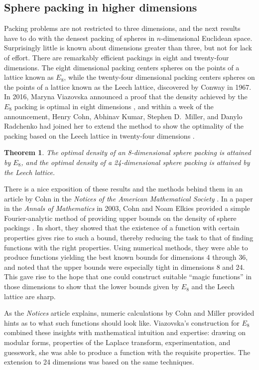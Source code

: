 \documentclass[12pt]{amsart}
\newtheorem{theorem}{Theorem}[section]
\theoremstyle{definition}
\theoremstyle{remark}
\numberwithin{equation}{section}
\begin{document}
\subsection{Sphere packing in higher dimensions}

Packing problems are not restricted to three dimensions, and the next results have to do with the densest packing of spheres in $n$-dimensional Euclidean space. Surprisingly little is known about dimensions greater than three, but not for lack of effort. There are remarkably efficient packings in eight and twenty-four dimensions. The eight dimensional packing centers spheres on the points of a lattice known as $E_8$, while the twenty-four dimensional packing centers spheres on the points of a lattice known as the Leech lattice, discovered by Conway in 1967. In 2016, Maryna Viazovska announced a proof that the density achieved by the $E_8$ packing is optimal in eight dimensions \cite{viazovska:17}, and within a week of the announcement, Henry Cohn, Abhinav Kumar, Stephen D.~Miller, and Danylo Radchenko had joined her to extend the method to show the optimality of the packing based on the Leech lattice in twenty-four dimensions \cite{cohn:et:al:17}.

\begin{theorem}
\label{theorem:leech}
The optimal density of an 8-dimensional sphere packing is attained by $E_8$, and the optimal density of a 24-dimensional sphere packing is attained by the Leech lattice.
\end{theorem}

There is a nice exposition of these results and the methods behind them in an article by Cohn in the \emph{Notices of the American Mathematical Society} \cite{cohn:17}. In a paper in the \emph{Annals of Mathematics} in 2003, Cohn and Noam Elkies provided a simple Fourier-analytic method of providing upper bounds on the density of sphere packings \cite{cohn:17}. In short, they showed that the existence of a function with certain properties gives rise to such a bound, thereby reducing the task to that of finding functions with the right properties. Using numerical methods, they were able to produce functions yielding the best known bounds for dimensions 4 through 36, and noted that the upper bounds were especially tight in dimensions 8 and 24. This gave rise to the hope that one could construct suitable ``magic functions'' in those dimensions to show that the lower bounds given by $E_8$ and the Leech lattice are sharp.

As the \emph{Notices} article explains, numeric calculations by Cohn and Miller provided hints as to what such functions should look like. Viazovska's construction for $E_8$ combined these insights with mathematical intuition and expertise: drawing on modular forms, properties of the Laplace transform, experimentation, and guesswork, she was able to produce a function with the requisite properties. The extension to 24 dimensions was based on the same techniques.
\end{document}
